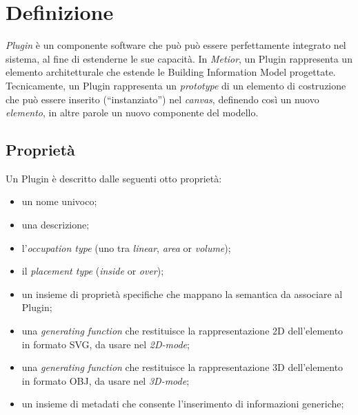 \section{Definizione}
\label{sec:chapter_3_section_1}

\emph{Plugin} \`e un componente software che pu\`o può essere perfettamente integrato nel sistema, al fine di estenderne
le sue capacità.
In \emph{Metior}, un Plugin rappresenta un elemento architetturale che estende le Building Information Model progettate.
Tecnicamente, un Plugin rappresenta un \emph{prototype} di un elemento di
costruzione che può essere inserito (``instanziato'') nel \emph{canvas}, definendo cos\`i un nuovo \emph{elemento},
in altre parole un nuovo componente del modello.
\newpage

\subsection*{Proprietà}
\noindent
Un Plugin \`e descritto dalle seguenti otto propriet\`a:
\begin{itemize}
  \item un nome univoco;
  \item una descrizione;
  \item l'\emph{occupation type} (uno tra \emph{linear}, \emph{area} or \emph{volume});
  \item il \emph{placement type} (\emph{inside} or \emph{over});
  \item un insieme di proprietà specifiche che mappano la semantica da associare al Plugin;
  \item  una \emph{generating function} che restituisce la rappresentazione 2D dell'elemento in formato SVG, da usare nel \emph{2D-mode};
  \item  una \emph{generating function} che restituisce la rappresentazione 3D dell'elemento in formato OBJ, da usare nel  \emph{3D-mode};
  \item un insieme di metadati che consente l'inserimento di informazioni generiche;
\end{itemize}
